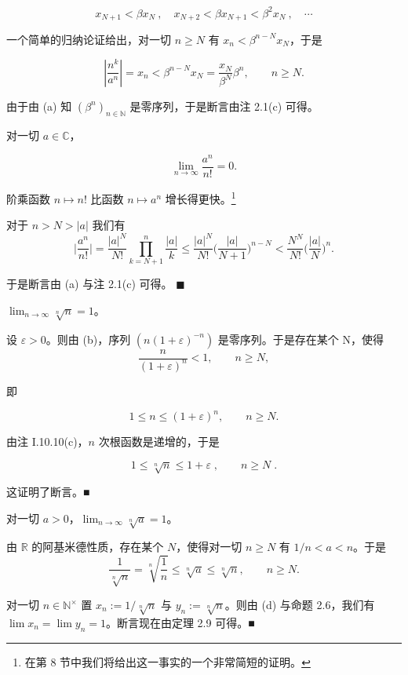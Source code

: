 \begin{example}
\begin{items}
\[
x_{N+1}<\beta x_{N}~,\quad x_{N+2}<\beta x_{N+1}<\beta^{2}x_{N}~,\quad\cdots
\]

一个简单的归纳论证给出，对一切  $ n \geq N $ 有  $ x_n < \beta^{n-N} x_N $，于是

\[
\left|\frac{n^{k}}{a^{n}}\right|=x_{n}<\beta^{n-N}x_{N}=\frac{x_{N}}{\beta^{N}}\beta^{n},\qquad n\geq N.
\]

由于由 (a) 知  $ (\beta^n)_{n\in\mathbb{N}} $ 是零序列，于是断言由注 2.1(c) 可得。

\item

对一切  $ a \in \mathbb{C} $，

\[
\lim_{n\to\infty}\frac{a^{n}}{n!}=0.
\]

阶乘函数 $ n \mapsto n! $ 比函数 $ n \mapsto a^{n} $ 增长得更快。\footnote{在第 8 节中我们将给出这一事实的一个非常简短的证明。}

\proofhead
对于 $n>N>|a|$ 我们有
\[
\Big|\frac{a^{n}}{n!}\Big|=\frac{|a|^{N}}{N!}\prod_{k=N+1}^{n}\frac{|a|}{k}\leq\frac{|a|^{N}}{N!}\Big(\frac{|a|}{N+1}\Big)^{n-N}<\frac{N^{N}}{N!}\Big(\frac{|a|}{N}\Big)^{n}.
\]

于是断言由 (a) 与注 2.1(c) 可得。  $ \blacksquare $

\item

$ \lim_{n \to \infty} \sqrt[n]{n} = 1 $。

\proofhead
设  $ \varepsilon > 0 $。则由 (b)，序列  $ (n(1 + \varepsilon)^{-n}) $ 是零序列。于是存在某个 N，使得
\[
\frac{n}{(1+\varepsilon)^{n}}<1,\qquad n\geq N,
\]

即

\[
1\leq n\leq\left(1+\varepsilon\right)^{n},\qquad n\geq N.
\]

由注 I.10.10(c)，$ n $ 次根函数是递增的，于是

\[
1\leq\sqrt[n]{n}\leq1+\varepsilon\;,\qquad n\geq N\;.
\]

这证明了断言。■

\item

对一切  $ a > 0 $，$ \lim_{n \to \infty} \sqrt[n]{a} = 1 $。

\proofhead
由  $ \mathbb{R} $ 的阿基米德性质，存在某个  $ N $，使得对一切  $ n \geq N $ 有  $ 1/n < a < n $。于是
\[
\frac{1}{\sqrt[n]{n}}=\sqrt[n]{\frac{1}{n}}\leq\sqrt[n]{a}\leq\sqrt[n]{n},\qquad n\geq N.
\]

对一切  $ n \in \mathbb{N}^\times $ 置  $ x_n := 1/\sqrt[n]{n} $ 与  $ y_n := \sqrt[n]{n} $。则由 (d) 与命题 2.6，我们有  $ \lim x_n = \lim y_n = 1 $。断言现在由定理 2.9 可得。■


\end{items}
\end{example}
